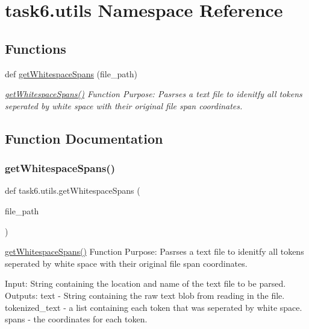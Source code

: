 \hypertarget{namespacetask6_1_1utils}{}\section{task6.\+utils Namespace Reference}
\label{namespacetask6_1_1utils}
\subsection*{Functions}
\begin{DoxyCompactItemize}
\item 
def \hyperlink{namespacetask6_1_1utils_a515e86e4cb66853a491562c4dd7935b1}{get\+Whitespace\+Spans} (file\+\_\+path)
\begin{DoxyCompactList}\small\item\em \hyperlink{namespacetask6_1_1utils_a515e86e4cb66853a491562c4dd7935b1}{get\+Whitespace\+Spans()} Function Purpose\+: Pasrses a text file to idenitfy all tokens seperated by white space with their original file span coordinates. \end{DoxyCompactList}\end{DoxyCompactItemize}


\subsection{Function Documentation}
\mbox{\label{namespacetask6_1_1utils_a515e86e4cb66853a491562c4dd7935b1}} 
\subsubsection{\texorpdfstring{get\+Whitespace\+Spans()}{getWhitespaceSpans()}}
{\footnotesize\ttfamily def task6.\+utils.\+get\+Whitespace\+Spans (\begin{DoxyParamCaption}\item[{}]{file\+\_\+path }\end{DoxyParamCaption})}



\hyperlink{namespacetask6_1_1utils_a515e86e4cb66853a491562c4dd7935b1}{get\+Whitespace\+Spans()} Function Purpose\+: Pasrses a text file to idenitfy all tokens seperated by white space with their original file span coordinates. 

Input\+: String containing the location and name of the text file to be parsed. Outputs\+: text -\/ String containing the raw text blob from reading in the file. tokenized\+\_\+text -\/ a list containing each token that was seperated by white space. spans -\/ the coordinates for each token. 